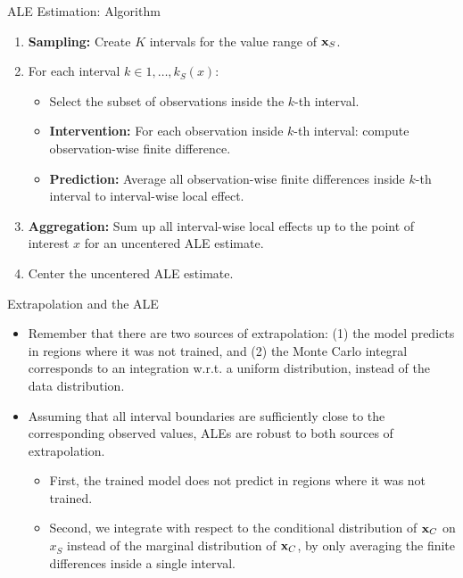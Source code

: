 \documentclass[11pt,compress,t,notes=noshow, xcolor=table]{beamer}
\begin{document}
\begin{vbframe}{ALE Estimation: Algorithm}

\begin{enumerate}
	\item \textbf{Sampling:} Create $K$ intervals for the value range of $\xv_S$.
	 \lz
	\item For each interval $k \in 1, \dots, k_S(x)$:
	  \begin{itemize}
	  \item Select the subset of observations inside the $k$-th interval.
	  \item \textbf{Intervention:} For each observation inside $k$-th interval: compute observation-wise finite difference.
	  \item \textbf{Prediction:} Average all observation-wise finite differences inside $k$-th interval to interval-wise local effect.
	  \end{itemize}
	  \lz
  \item \textbf{Aggregation:} Sum up all interval-wise local effects up to the point of interest $x$ for an uncentered ALE estimate.
  \lz
  \item Center the uncentered ALE estimate.
\end{enumerate}

\end{vbframe}

\begin{vbframe}{Extrapolation and the ALE}
\begin{itemize}

\item Remember that there are two sources of extrapolation: (1) the model predicts in regions where it was not trained, and (2) the Monte Carlo integral corresponds to an integration w.r.t. a uniform distribution, instead of the data distribution.
\item Assuming that all interval boundaries are sufficiently close to the corresponding observed values, ALEs are robust to both sources of extrapolation.
  \begin{itemize}
    \item First, the trained model does not predict in regions where it was not trained.
    \item Second, we integrate with respect to the conditional distribution of $\xv_C$ on $x_S$ instead of the marginal distribution of $\xv_C$, by only averaging the finite differences inside a single interval.
  \end{itemize}
\end{itemize}
\end{vbframe}
\end{document}
